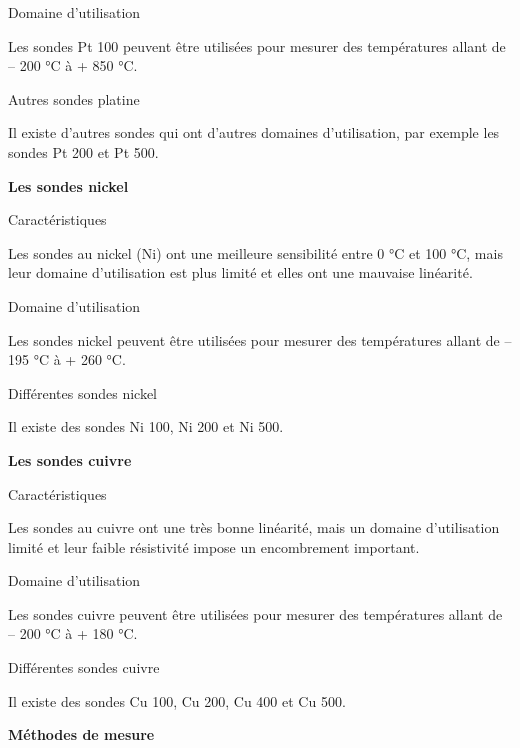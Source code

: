 Domaine d’utilisation
\vspace{0.3cm} 

Les sondes Pt 100 peuvent être utilisées pour mesurer des températures allant de – 200 °C à + 850 °C.


Autres sondes platine
\vspace{0.3cm}

Il existe d’autres sondes qui ont d’autres domaines d’utilisation, par exemple les sondes Pt 200 et Pt 500.

\vspace{0.3cm}
\textbf{Les sondes nickel}
\vspace{0.3cm}

Caractéristiques
\vspace{0.3cm}

Les sondes au nickel (Ni) ont une meilleure sensibilité entre 0 °C et 100 °C, mais leur domaine d’utilisation est plus limité et elles ont une mauvaise linéarité.


Domaine d’utilisation
\vspace{0.3cm}

Les sondes nickel peuvent être utilisées pour mesurer des températures allant de – 195 °C à + 260 °C.


Différentes sondes nickel
\vspace{0.3cm}

Il existe des sondes Ni 100, Ni 200 et Ni 500.

\newpage

\vspace{0.3cm}
\textbf{Les sondes cuivre}
\vspace{0.3cm}

Caractéristiques
\vspace{0.3cm}

Les sondes au cuivre ont une très bonne linéarité, mais un domaine d’utilisation limité et leur faible résistivité impose un encombrement important.

Domaine d’utilisation
\vspace{0.3cm}

Les sondes cuivre peuvent être utilisées pour mesurer des températures allant de – 200 °C à + 180 °C.


Différentes sondes cuivre
\vspace{0.3cm}

Il existe des sondes Cu 100, Cu 200, Cu 400 et Cu 500.


\vspace{0.3cm}
\textbf{	Méthodes de mesure}
\vspace{0.3cm}

